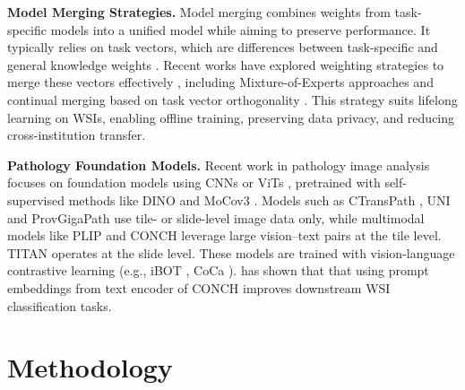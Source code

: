\documentclass[10pt,twocolumn,letterpaper]{article}
\begin{document}

\noindent\textbf{Model Merging Strategies.} Model merging combines weights from task-specific models into a unified model while aiming to preserve performance. It typically relies on task vectors, which are differences between task-specific and general knowledge weights \cite{ilharco2022editing}. Recent works have explored weighting strategies to merge these vectors effectively \cite{ilharco2022editing,yadav2023ties,yang2023adamerging,tang2024merging}, including Mixture-of-Experts approaches \cite{yang2023adamerging,tang2024merging} and continual merging based on task vector orthogonality \cite{tang2025merging}. This strategy suits lifelong learning on WSIs, enabling offline training, preserving data privacy, and reducing cross-institution transfer. 

\noindent\textbf{Pathology Foundation Models.} Recent work in pathology image analysis focuses on foundation models using CNNs \cite{he2016deep} or ViTs \cite{dosovitskiy2020image}, pretrained with self-supervised methods like DINO \cite{caron2021emerging} and MoCov3 \cite{chen2021empirical}. Models such as CTransPath \cite{wang2022transformer}, UNI \cite{chen2024towards} and ProvGigaPath \cite{xu2024whole} use tile- or slide-level image data only, while multimodal models like PLIP \cite{huang2023visual} and CONCH \cite{lu2024visual} leverage large vision–text pairs at the tile level. TITAN \cite{ding2024multimodal} operates at the slide level. These models are trained with vision-language contrastive learning (e.g., iBOT \cite{zhou2021ibot}, CoCa \cite{yu2022coca}). \cite{huang2024free} has shown that that using prompt embeddings from text encoder of CONCH improves downstream WSI classification tasks.

\section{Methodology}
\label{sec:methodology}
\end{document}
